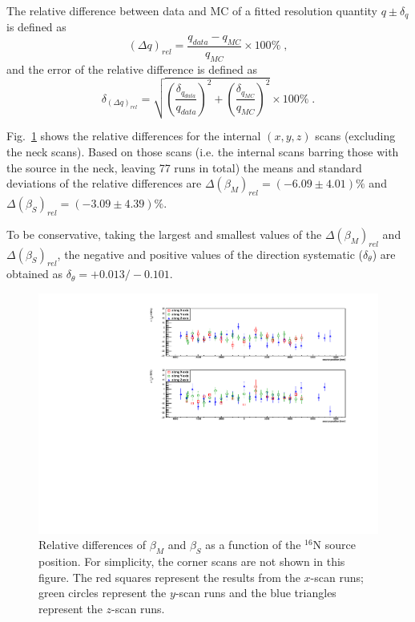 The relative difference between data and MC of a fitted resolution quantity $q\pm \delta_q$ is defined as
\begin{equation}
(\Delta q)_{rel} = \frac{q_{data}-q_{MC}}{q_{MC}}\times 100\%\;,
\end{equation}
and the error of the relative difference is defined as 
\begin{equation}
\delta_{(\Delta q)_{rel}} = \sqrt{(\frac{\delta_{q_{data}}}{q_{data}})^2+(\frac{\delta_{q_{MC}}}{q_{MC}})^2}\times 100\% \; .
\end{equation}\label{eq:erors_relativeBiases}

Fig.~\ref{relative_biasesVsPositions} shows the relative differences for the internal $(x, y, z)$ scans (excluding the neck scans). Based on those scans (i.e. the internal scans barring those with the source in the neck, leaving 77 runs in total) the means and standard deviations of the relative differences are $\Delta(\beta_M)_{rel}=(-6.09\pm4.01)\%$ and $\Delta(\beta_S)_{rel}=(-3.09\pm4.39)\%$.

To be conservative, taking the largest and smallest values of the $\Delta(\beta_M)_{rel}$ and $\Delta(\beta_S)_{rel}$, the negative and positive values of the direction systematic ($\delta_\theta$) are obtained as $\delta_\theta=+0.013/-0.101$.

\begin{figure}[!htb]
	\centering
	\includegraphics[width=16cm]{angularResol_scanXYZ.pdf}
	\caption[Relative differences of $\beta_M$ and $\beta_S$ as a function of the $^{16}$N source position.]{Relative differences of $\beta_M$ and $\beta_S$ as a function of the $^{16}$N source position. For simplicity, the corner scans are not shown in this figure. The red squares represent the results from the $x$-scan runs; green circles represent the $y$-scan runs and the blue triangles represent the $z$-scan runs. \label{relative_biasesVsPositions}}
\end{figure}

